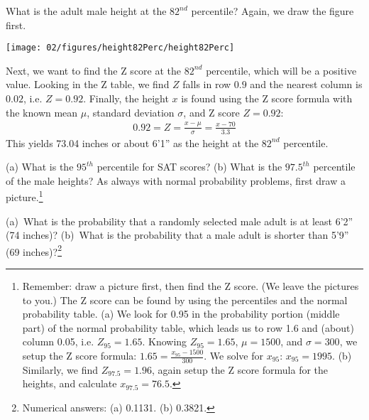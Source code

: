 \begin{example}{What is the adult male height at the $82^{nd}$ percentile?}
Again, we draw the figure first.\vspace{-3mm}
\begin{center}
\texttt{[image: 02/figures/height82Perc/height82Perc]}\vspace{-2mm}
\end{center}
Next, we want to find the Z score at the $82^{nd}$ percentile, which will be a positive value. Looking in the Z table, we find $Z$ falls in row $0.9$ and the nearest column is $0.02$, i.e. $Z=0.92$. Finally, the height $x$ is found using the Z score formula with the known mean $\mu$, standard deviation $\sigma$, and Z score $Z=0.92$:
\begin{eqnarray*}
0.92 = Z = \frac{x-\mu}{\sigma} = \frac{x - 70}{3.3}
\end{eqnarray*}
This yields 73.04 inches or about 6'1'' as the height at the $82^{nd}$ percentile.
\end{example}

\begin{exercise}
(a) What is the $95^{th}$ percentile for SAT scores? (b) What is the $97.5^{th}$ percentile of the male heights? As always with normal probability problems, first draw a picture.\footnote{Remember: draw a picture first, then find the Z score. (We leave the pictures to you.) The Z score can be found by using the percentiles and the normal probability table. (a) We look for 0.95 in the probability portion (middle part) of the normal probability table, which leads us to row 1.6 and (about) column 0.05, i.e. $Z_{95}=1.65$. Knowing $Z_{95}=1.65$, $\mu = 1500$, and $\sigma = 300$, we setup the Z score formula: $1.65 = \frac{x_{95} - 1500}{300}$. We solve for $x_{95}$: $x_{95} = 1995$. (b) Similarly, we find $Z_{97.5} = 1.96$, again setup the Z score formula for the heights, and calculate $x_{97.5} = 76.5$.}
\end{exercise}

\begin{exercise}\label{more74Less69}
(a)~What is the probability that a randomly selected male adult is at least 6'2'' (74 inches)? (b)~What is the probability that a male adult is shorter than 5'9'' (69 inches)?\footnote{Numerical answers: (a) 0.1131. (b) 0.3821.}
\end{exercise}

